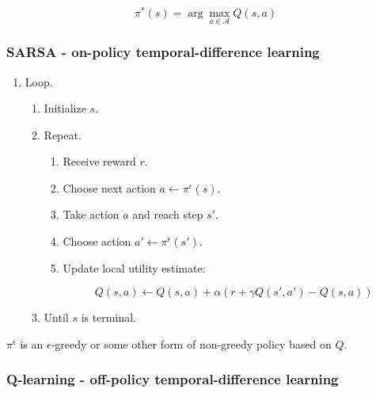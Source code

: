 		$$\pi^*(s) = \arg\max\limits_{a\in\mathcal{A}}Q(s,a)$$
	
		\subsubsection{SARSA - on-policy temporal-difference learning}

		\begin{enumerate}
			\item Loop.

				\begin{enumerate}
					\item Initialize $s$.
					\item Repeat.

						\begin{enumerate}
							\item Receive reward $r$.
							\item Choose next action $a\leftarrow\pi^\epsilon(s)$.
							\item Take action $a$ and reach step $s'$.
							\item Choose action $a'\leftarrow\pi^\epsilon(s')$.
							\item Update local utility estimate:

								$$Q(s,a) \leftarrow Q(s,a) + \alpha(r+\gamma Q(s',a')- Q(s,a))$$

						\end{enumerate}

					\item Until $s$ is terminal.
				\end{enumerate}

		\end{enumerate}

		$\pi^\epsilon$ is an $\epsilon$-greedy or some other form of non-greedy policy based on $Q$.
	
		\subsubsection{Q-learning - off-policy temporal-difference learning}

